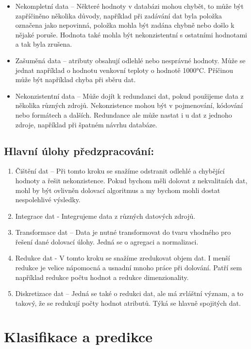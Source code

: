 \begin{itemize}
\item Nekompletní data – Některé hodnoty v databázi mohou chybět, to může být zapříčiněno několika důvody, například při zadávání dat byla položka označena jako nepovinná, položka mohla být zadána chybně nebo došlo k nějaké poruše. Hodnota také mohla být nekonzistentní s ostatními hodnotami a tak byla zrušena.
\item Zašuměná data – atributy obsahují odlehlé nebo nesprávné hodnoty. Může se jednat například o hodnotu venkovní teploty o hodnotě 1000°C.  Příčinou může být například chyba při sběru dat.
\item Nekonzistentní data – Může dojít k redundanci dat, pokud použijeme data z několika různých zdrojů. Nekonzistence mohou být v pojmenování, kódování nebo formátech a dalších. Redundance ale může nastat i u dat z jednoho zdroje, například při špatném návrhu databáze. 

\end{itemize}

\subsection*{Hlavní úlohy předzpracování: \cite[Kapitola~3]{Kamber}} 

\begin{enumerate}
  \item{Čištění dat – Při tomto kroku se snažíme odstranit odlehlé a chybějící hodnoty a řešit nekonzistence. Pokud bychom měli dolovat z nekvalitních dat, mohl by být ovlivněn dolovací algoritmus a my bychom mohli dostat nespolehlivé výsledky.}
  \item{Integrace dat -  Integrujeme data z různých datových zdrojů.}
  \item{Transformace dat – Data je nutné transformovat do tvaru vhodného pro řešení dané dolovací úlohy. Jedná se o agregaci a normalizaci. }
  \item{Redukce dat - V tomto kroku se snažíme zredukovat objem dat. I menší redukce je velice nápomocná a usnadní mnoho práce při dolování. Patří sem například redukce počtu hodnot a redukce dimenzionality.}
  \item{Diskretizace dat – Jedná se také o redukci dat, ale má zvláštní význam, a to takový, že se redukují počty hodnot atributů. Týká se hlavně spojitých dat.}

\end{enumerate}


\section{Klasifikace a predikce}

